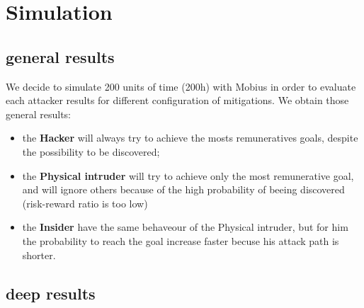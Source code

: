 %
\chapter{Simulation}\label{ch:simulation}
\section{general results}
We decide to simulate 200 units of time (200h) with Mobius in order to evaluate each attacker results for 
different configuration of mitigations. We obtain those general results:\\
\begin{itemize}
    \item the \textbf{Hacker} will always try to achieve the mosts remuneratives goals, despite the
        possibility to be discovered; 
    \item the \textbf{Physical intruder} will try to achieve only the most remunerative goal, and will
        ignore others because of the high probability of beeing discovered (risk-reward ratio is too low)
    \item the \textbf{Insider} have the same behaveour of the Physical intruder, but for him the probability
        to reach the goal increase faster becuse his attack path is shorter.
\end{itemize}
\section{deep results}
